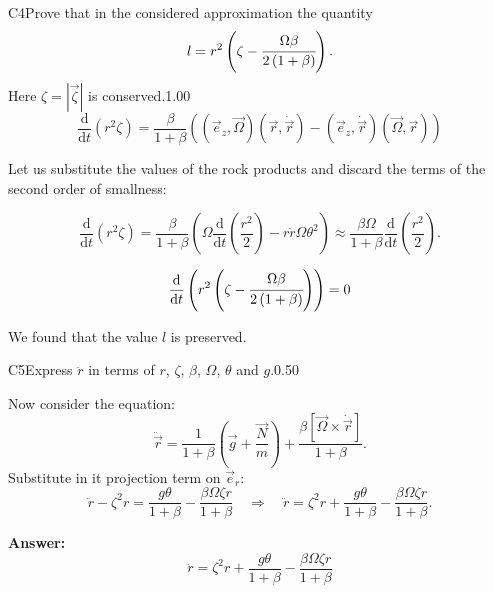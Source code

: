 \documentclass[11pt,a4paper]{article}
\begin{document}
\begin{solcard}{C4}{Prove that in the considered approximation the quantity $$ l = r^2 \left( \zeta-\cfrac{\Omega\beta}{2\left(1+\beta\right)} \right). $$Here $\zeta = |\vec{\zeta}|$ is conserved.}{1.00}
$$\frac{\text{d}}{\text{d}t}\left(r^2\zeta\right) = \frac{\beta}{1+\beta} \left(\left(\vec e_z, \vec\Omega\right)\left(\vec r,\dot{\vec r}\right) - \left(\vec e_z,\dot{\vec r}\right) \left(\vec\Omega, \vec r\right)\right)$$


Let us substitute the values of the rock products and discard the terms of the second order of smallness:


$$\frac{\text{d}}{\text{d}t}\left(r^2\zeta\right) = \frac{\beta}{1+\beta} \left(\Omega\frac{\text{d}}{\text{d}t}\left(\frac{r^2}{2}\right) - r\dot{r}\Omega \theta^2\right) \approx \frac{\beta\Omega}{1+\beta}\frac{\text{d}}{\text{d}t}\left(\frac{r^2}{2}\right) .$$


$$\frac{\text{d}}{\text{d}t}\left(r^2 \left( \zeta-\cfrac{\Omega\beta}{2\left(1+\beta\right)} \right)\right) = 0$$


We found that the value $l$ is preserved.

\end{solcard}

\begin{solcard}{C5}{Express $\ddot{r}$ in terms of $r$, $\zeta$, $\beta$, $\Omega$, $\theta$ and $g$.}{0.50}

Now consider the equation: $$ \ddot{\vec r} = \frac{1}{1+\beta} \left(\vec g + \frac{\vec N}{m}\right) + \frac{\beta\left[\vec \Omega \times \dot{\vec r}\right]}{1 + \beta}. $$Substitute in it projection term on $\vec e_r$: $$ \ddot r - \zeta^2 r = \frac{g \theta}{1 + \beta} - \frac{\beta \Omega \zeta r}{1 + \beta} \quad \Rightarrow \quad \ddot r = \zeta^2 r + \frac{g \theta}{1 + \beta} - \frac{\beta \Omega \zeta r}{1 + \beta}. $$

\par\smallskip\noindent\textbf{Answer:} $$ \ddot r = \zeta^2 r + \frac{g \theta}{1 + \beta} - \frac{\beta \Omega \zeta r}{1 + \beta} $$
\end{solcard}
\end{document}
